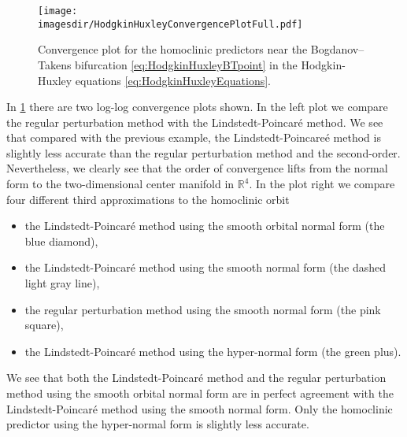 \begin{figure}
    \texttt{[image: \\imagesdir/HodgkinHuxleyConvergencePlotFull.pdf]}
    \caption{Convergence plot for the homoclinic predictors near the
    Bogdanov--Takens bifurcation \cref{eq:HodgkinHuxleyBTpoint} in the
    Hodgkin-Huxley equations \cref{eq:HodgkinHuxleyEquations}.}
    \label{fig:HodgkinHuxleyConvergencePlot}
\end{figure}

In \cref{fig:HodgkinHuxleyConvergencePlot} there are two log-log convergence
plots shown. In the left plot we compare the regular
perturbation method with the Lindstedt-Poincar\'e method. We see that compared
with the previous example, the Lindstedt-Poincare\'e method is slightly less
accurate than the regular perturbation method and the second-order.
Nevertheless, we clearly see that the order of convergence lifts from the
normal form to the two-dimensional center manifold in $\mathbb R^4$. In the
plot right we compare four different third approximations to the homoclinic
orbit
\begin{itemize}
    \item the Lindstedt-Poincar\'e method using the smooth orbital normal form
        (the blue diamond),
    \item the Lindstedt-Poincar\'e method using the smooth normal form
        (the dashed light gray line),
    \item the regular perturbation method using the smooth normal form
        (the pink square), 
    \item the Lindstedt-Poincar\'e method using the hyper-normal form
        (the green plus).
\end{itemize}

We see that both the Lindstedt-Poincar\'e method and the regular perturbation
method using the smooth orbital normal form are in perfect agreement with the
Lindstedt-Poincar\'e method using the smooth normal form. Only the homoclinic
predictor using the hyper-normal form is slightly less accurate.

